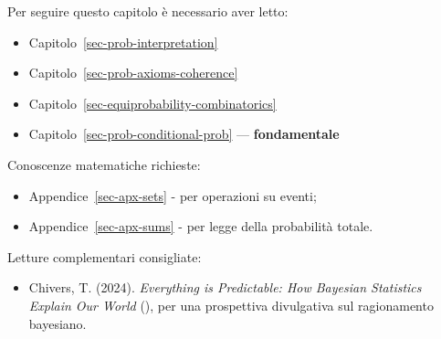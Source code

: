 \documentclass[
  italian,
  letterpaper,
  a4paper,
  11pt,
  open=any]{scrbook}
\providecommand{\tightlist}{%
  \setlength{\itemsep}{0pt}\setlength{\parskip}{0pt}}
\theoremstyle{plain}
\theoremstyle{definition}
\theoremstyle{definition}
\theoremstyle{remark}
\begin{document}
\begin{tcolorbox}[enhanced jigsaw, arc=.35mm, bottomrule=.15mm, bottomtitle=1mm, breakable, colback=white, colbacktitle=quarto-callout-tip-color!10!white, colframe=quarto-callout-tip-color-frame, coltitle=black, left=2mm, leftrule=.75mm, opacityback=0, opacitybacktitle=0.6, rightrule=.15mm, title=\textcolor{quarto-callout-tip-color}{\faLightbulb}\hspace{0.5em}{Prerequisiti}, titlerule=0mm, toprule=.15mm, toptitle=1mm]

Per seguire questo capitolo è necessario aver letto:

\begin{itemize}
\tightlist
\item
  Capitolo~\ref{sec-prob-interpretation}
\item
  Capitolo~\ref{sec-prob-axioms-coherence}
\item
  Capitolo~\ref{sec-equiprobability-combinatorics}
\item
  Capitolo~\ref{sec-prob-conditional-prob} --- \textbf{fondamentale}
\end{itemize}

Conoscenze matematiche richieste:

\begin{itemize}
\tightlist
\item
  Appendice~\ref{sec-apx-sets} - per operazioni su eventi;
\item
  Appendice~\ref{sec-apx-sums} - per legge della probabilità totale.
\end{itemize}

Letture complementari consigliate:

\begin{itemize}
\tightlist
\item
  Chivers, T. (2024). \emph{Everything is Predictable: How Bayesian
  Statistics Explain Our World}
  (), per una
  prospettiva divulgativa sul ragionamento bayesiano.
\end{itemize}

\end{tcolorbox}
\end{document}
